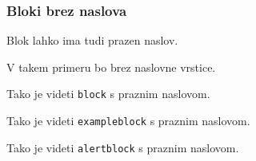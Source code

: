 \documentclass[11pt,hyperref={unicode}]{beamer}
\begin{document}
\begin{frame}
   \frametitle{Bloki brez naslova}
   Blok lahko ima tudi prazen naslov.
   
   V takem primeru bo brez naslovne vrstice.
   
   \begin{block}{}
      Tako je videti \texttt{block} s praznim naslovom.
   \end{block}
   
   \begin{exampleblock}{}      
      Tako je videti \texttt{exampleblock} s praznim naslovom.
   \end{exampleblock}

   \begin{alertblock}{}
      Tako je videti \texttt{alertblock} s praznim naslovom.
   \end{alertblock}
\end{frame}
\end{document}
